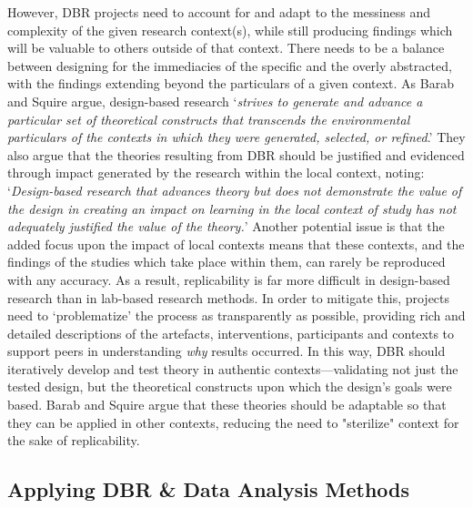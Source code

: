 However, DBR projects need to account for and adapt to the messiness and complexity of the given research context(s), while still producing findings which will be valuable to others outside of that context. There needs to be a balance between designing for the immediacies of the specific and the overly abstracted, with the findings extending beyond the particulars of a given context. As Barab and Squire argue, design-based research `\textit{strives to generate and advance a particular set of theoretical constructs that transcends the environmental particulars of the contexts in which they were generated, selected, or refined}.' They also argue that the theories resulting from DBR should be justified and evidenced through impact generated by the research within the local context, noting: `\textit{Design-based research that advances theory but does not demonstrate the value of the design in creating an impact on learning in the local context of study has not adequately justified the value of the theory.}' Another potential issue is that the added focus upon the impact of local contexts means that these contexts, and the findings of the studies which take place within them, can rarely be reproduced with any accuracy. As a result, replicability is far more difficult in design-based research than in lab-based research methods. In order to mitigate this, projects need to `problematize' the process as transparently as possible, providing rich and detailed descriptions of the artefacts, interventions, participants and contexts to support peers in understanding \textit{why} results occurred. In this way, DBR should iteratively develop and test theory in authentic contexts---validating not just the tested design, but the theoretical constructs upon which the design's goals were based. Barab and Squire argue that these theories should be adaptable so that they can be applied in other contexts, reducing the need to "sterilize" context for the sake of replicability.

\subsection{Applying DBR \& Data Analysis Methods}
\label{sec:applyingdbr}

